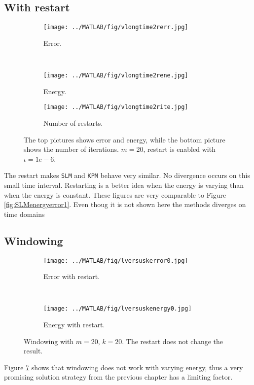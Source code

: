 \subsection{With restart} %
\begin{figure}[H]
        \centering
        \begin{subfigure}[b]{0.45\textwidth}
                \texttt{[image: ../MATLAB/fig/vlongtime2rerr.jpg]}
                \caption{ Error. }
                \label{fig:vlongtime2rerr}
        \end{subfigure}
        ~
        \begin{subfigure}[b]{0.45\textwidth}
                \texttt{[image: ../MATLAB/fig/vlongtime2rene.jpg]}
                \caption{ Energy. }
                \label{fig:vlongtime8rerr}
        \end{subfigure}
     
        
        \begin{subfigure}[b]{0.45\textwidth}
                \texttt{[image: ../MATLAB/fig/vlongtime2rite.jpg]}
                \caption{ Number of restarts. }
                \label{fig:vlongtime2rene}
        \end{subfigure}
        \caption{ The top pictures shows error and energy, while the bottom picture shows the number of iterations. $m = 20$, restart is enabled with $\iota = 1e-6$. }
        \label{fig:vSLMenergyerror1}
\end{figure}
The restart makes \texttt{SLM} and \texttt{KPM} behave very similar. No divergence occurs on this small time interval. Restarting is a better idea when the energy is varying than when the energy is constant. These figures are very comparable to Figure \ref{fig:SLMenergyerror1}. Even thoug it is not shown here the methods diverges on time domains 
\subsection{Windowing}%
\begin{figure}[H]
        \centering
        \begin{subfigure}[b]{0.45\textwidth}
                \texttt{[image: ../MATLAB/fig/lversuskerror0.jpg]}
                \caption{ Error with restart. }
                \label{fig:lversuskerror0}
        \end{subfigure}
		~
		\begin{subfigure}[b]{0.45\textwidth}
                \texttt{[image: ../MATLAB/fig/lversuskenergy0.jpg]}
                \caption{ Energy with restart. }
                \label{fig:lversuskenergy0}
        \end{subfigure}
                \caption{ Windowing with $m = 20$, $k= 20$. The restart does not change the result.}
        \label{fig:lversuskenergy}
\end{figure}
\noindent Figure \ref{fig:lversuskenergy} shows that windowing does not work with varying energy, thus a very promising solution strategy from the previous chapter has a limiting factor.\\


